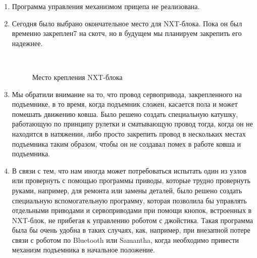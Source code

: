 \begin{enumerate}
\begin{enumerate}
		\item Программа управления механизмом прицепа не реализована.\newline
		
		\item Сегодня было выбрано окончательное место для NXT-блока. Пока он был временно закреплен7 на скотч, но в будущем мы планируем закрепить его надежнее.\newline
		
		\begin{figure}[H]
			\begin{minipage}[h]{0.2\linewidth}
				\center  
			\end{minipage}
			\begin{minipage}[h]{0.6\linewidth}
				\caption{Место крепления NXT-блока}
			\end{minipage}
		\end{figure}
		
		\item Мы обратили внимание на то, что провод сервопривода, закрепленного на подъемнике, в то время, когда подъемник сложен, касается пола и может помешать движению ковша. Было решено создать специальную катушку, работающую по принципу рулетки и сматывающую провод тогда, когда он не находится в натяжении, либо просто закрепить провод в нескольких местах подъемника таким образом, чтобы он не создавал помех в работе ковша и подъемника.\newline
		
		\item В связи с тем, что нам иногда может потребоваться испытать один из узлов или провернуть с помощью программы приводы, которые трудно провернуть руками, например, для ремонта или замены деталей, было решено создать специальную вспомогательную программу, которая позволила бы управлять отдельными приводами и сервоприводами при помощи кнопок, встроенных в NXT-блок, не прибегая к управлению роботом с джойстика. Такая программа была бы очень удобна в таких случаях, как, например, при внезапной потере связи с роботом по Bluetooth или Samantha, когда необходимо привести механизм подъемника в начальное положение.\newline
		

\end{enumerate}
\end{enumerate}
